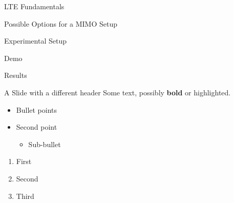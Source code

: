 \documentclass[10pt,t]{beamer}
\begin{document}
\begin{frame}{LTE Fundamentals}
\end{frame}

\begin{frame}{Possible Options for a MIMO Setup}
\end{frame}

\begin{frame}{Experimental Setup}
\end{frame}

\begin{frame}{Demo}
\end{frame}

\begin{frame}{Results}
\end{frame}


{
    \begin{frame}{A Slide with a different header}
        Some text, possibly \textbf{bold} or \alert{highlighted}.

        \begin{itemize}
            \item Bullet points
            \item Second point
                \begin{itemize}
                    \item Sub-bullet
                \end{itemize}
        \end{itemize}

        \pause
        \begin{enumerate}
            \item First
            \item Second
            \item Third
        \end{enumerate}

    \end{frame}
}
\end{document}
